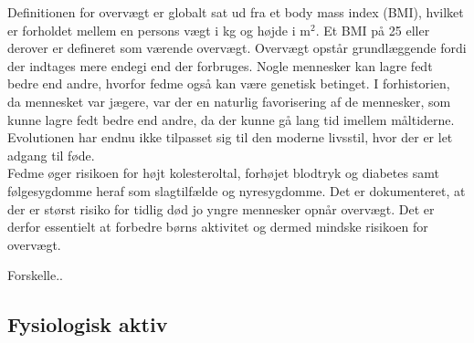 Definitionen for overvægt er globalt sat ud fra et body mass index (BMI), hvilket er forholdet mellem en persons vægt i kg og højde i m$^2$. Et BMI på 25 eller derover er defineret som værende overvægt. \citep{Academic2016} Overvægt opstår grundlæggende fordi der indtages mere endegi end der forbruges. Nogle mennesker kan lagre fedt bedre end andre, hvorfor fedme også kan være genetisk betinget. \citep{Nestle2014} I forhistorien, da mennesket var jægere, var der en naturlig favorisering af de mennesker, som kunne lagre fedt bedre end andre, da der kunne gå lang tid imellem måltiderne. Evolutionen har endnu ikke tilpasset sig til den moderne livsstil, hvor der er let adgang til føde. \citep{Ahmad2014} \\
Fedme øger risikoen for højt kolesteroltal, forhøjet blodtryk og diabetes samt følgesygdomme heraf som slagtilfælde og nyresygdomme. Det er dokumenteret, at der er størst risiko for tidlig død jo yngre mennesker opnår overvægt. Det er derfor essentielt at forbedre børns aktivitet og dermed mindske risikoen for overvægt. \citep{Nestle2014} 

Forskelle..


\subsection{Fysiologisk aktiv}

